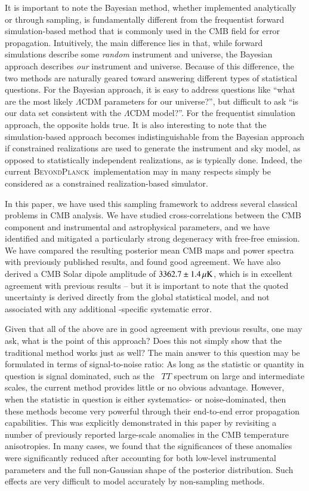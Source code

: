 \documentclass[twocolumn]{aa}
\newcommand{\BP}{\textsc{BeyondPlanck}}
\begin{document}
It is important to note the Bayesian method, whether implemented
analytically or through sampling, is fundamentally different from the
frequentist forward simulation-based method that is commonly used in
the CMB field for error propagation. Intuitively, the main difference
lies in that, while forward simulations describe some \emph{random}
instrument and universe, the Bayesian approach describes \emph{our}
instrument and universe. Because of this difference, the two methods
are naturally geared toward answering different types of statistical
questions. For the Bayesian approach, it is easy to address questions
like ``what are the most likely $\Lambda$CDM parameters for our
universe?'', but difficult to ask ``is our data set consistent with
the $\Lambda$CDM model?''. For the frequentist simulation approach,
the opposite holds true. It is also interesting to note that the
simulation-based approach becomes indistinguishable from the Bayesian
approach if constrained realizations are used to generate the
instrument and sky model, as opposed to statistically independent
realizations, as is typically done. Indeed, the current
\BP\ implementation may in many respects simply be considered as a
constrained realization-based simulator.

In this paper, we have used this sampling framework to address several
classical problems in CMB analysis. We have studied cross-correlations
between the CMB component and instrumental and astrophysical
parameters, and we have identified and mitigated a particularly strong
degeneracy with free-free emission. We have compared the resulting
posterior mean CMB maps and power spectra with previously published
results, and found good agreement. We have also derived a CMB Solar
dipole amplitude of $3362.7\pm1.4\muK$, which is in excellent
agreement with previous results -- but it is important to note that
the quoted uncertainty is derived directly from the global statistical
model, and not associated with any additional \Planck-specific
systematic error.

Given that all of the above are in good agreement with previous
results, one may ask, what is the point of this approach? Does this
not simply show that the traditional method works just as well? The
main answer to this question may be formulated in terms of
signal-to-noise ratio: As long as the statistic or quantity in
question is signal dominated, such as the \Planck\ $TT$ spectrum on
large and intermediate scales, the current method provides little or
no obvious advantage. However, when the statistic in question is
either systematics- or noise-dominated, then these methods become very
powerful through their end-to-end error propagation capabilities. This
was explicitly demonstrated in this paper by revisiting a number of
previously reported large-scale anomalies in the CMB temperature
anisotropies. In many cases, we found that the significances of these
anomalies were significantly reduced after accounting for both
low-level instrumental parameters and the full non-Gaussian shape of
the posterior distribution. Such effects are very difficult to model
accurately by non-sampling methods.
\end{document}
